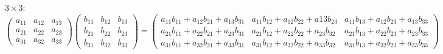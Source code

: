 \documentclass[reqno]{amsart}
\theoremstyle{definition}
\begin{document}
$3 \times 3$:
%
\begin{equation}
\begin{pmatrix}
a_{11} & a_{12} & a_{13}\\
a_{21} & a_{22} & a_{23}\\
a_{31} & a_{32} & a_{33}
\end{pmatrix}\begin{pmatrix}
b_{11} & b_{12} & b_{13}\\
b_{21} & b_{22} & b_{23}\\
b_{31} & b_{32} & b_{33}
\end{pmatrix} = \begin{pmatrix}
a_{11}b_{11} + a_{12}b_{21} + a_{13}b_{31} & a_{11}b_{12} + a_{12}b_{22} + a{13}b_{23}
& a_{11}b_{13} + a_{12}b_{23} + a_{13}b_{33}\\
a_{21}b_{11} + a_{22}b_{21} + a_{23}b_{31} & a_{21}b_{12} + a_{22}b_{22} + a_{23}b_{32}
& a_{21}b_{13} + a_{22}b_{23} + a_{23}b_{33}\\
a_{31}b_{11} + a_{32}b_{21} + a_{33}b_{31} & a_{31}b_{12} + a_{32}b_{22} + a_{33}b_{32}
& a_{31}b_{13} + a_{32}b_{23} + a_{33}b_{33}
\end{pmatrix}
\end{equation}
\end{document}

